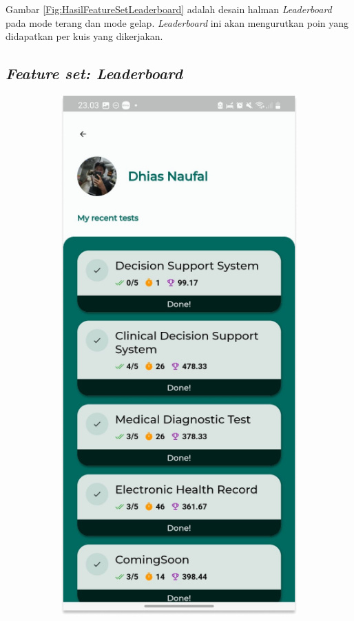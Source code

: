 Gambar \ref*{Fig:HasilFeatureSetLeaderboard} adalah desain halman \textit{Leaderboard} pada mode terang dan mode gelap.
\textit{Leaderboard} ini akan mengurutkan poin yang didapatkan per kuis yang dikerjakan.
\subsection{\textit{Feature set: Leaderboard}}
\begin{figure}[H]
	\centering
	\begin{subfigure}[b]{0.23\textwidth}
		\centering
	  \includegraphics[width=\linewidth]{contents/chapter-3/images/HF-profil.png}

\end{subfigure}
\end{figure}
